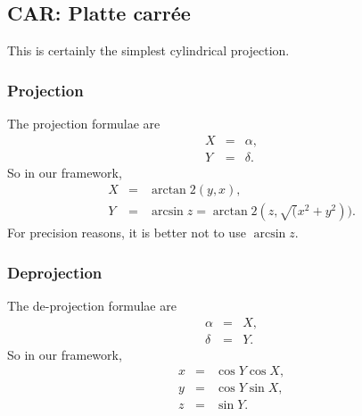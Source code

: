 \subsection{CAR: Platte carr\'ee}

  This is certainly the simplest cylindrical projection.

  \subsubsection{Projection}

    The projection formulae are
    \begin{eqnarray}
      X & = & \alpha, \\
      Y & = & \delta.
    \end{eqnarray}
    So in our framework, 
    \begin{eqnarray}
      X & = & \arctan 2(y, x), \\
      Y & = & \arcsin z = \arctan 2(z, \sqrt(x^2 + y^2)).
    \end{eqnarray}
    For precision reasons, it is better not to use $\arcsin z$.


  \subsubsection{Deprojection}

    The de-projection formulae are
    \begin{eqnarray}
      \alpha & = & X, \\
      \delta & = & Y.
    \end{eqnarray}
    So in our framework,
    \begin{eqnarray}
      x & = & \cos Y \cos X, \\
      y & = & \cos Y \sin X, \\
      z & = & \sin Y.
    \end{eqnarray}

